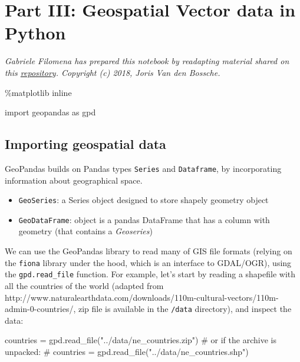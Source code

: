 \documentclass[
  letterpaper,
  DIV=11,
  numbers=noendperiod]{scrreprt}
\newenvironment{Shaded}{\begin{snugshade}}{\end{snugshade}}
\newcommand{\CommentTok}[1]{\textcolor[rgb]{0.37,0.37,0.37}{#1}}
\newcommand{\ImportTok}[1]{\textcolor[rgb]{0.00,0.46,0.62}{#1}}
\newcommand{\NormalTok}[1]{\textcolor[rgb]{0.00,0.23,0.31}{#1}}
\newcommand{\OperatorTok}[1]{\textcolor[rgb]{0.37,0.37,0.37}{#1}}
\newcommand{\StringTok}[1]{\textcolor[rgb]{0.13,0.47,0.30}{#1}}
\providecommand{\tightlist}{%
  \setlength{\itemsep}{0pt}\setlength{\parskip}{0pt}}\usepackage{longtable,booktabs,array}
\begin{document}
\section{Part III: Geospatial Vector data in
Python}\label{part-iii-geospatial-vector-data-in-python}

\emph{Gabriele Filomena has prepared this notebook by readapting
material shared on this
\href{https://github.com/jorisvandenbossche/geopandas-tutorial}{repository}.
Copyright (c) 2018, Joris Van den Bossche.}

\begin{Shaded}
\begin{Highlighting}[]
\OperatorTok{\%}\NormalTok{matplotlib inline}

\ImportTok{import}\NormalTok{ geopandas }\ImportTok{as}\NormalTok{ gpd}
\end{Highlighting}
\end{Shaded}

\subsection{Importing geospatial data}\label{importing-geospatial-data}

GeoPandas builds on Pandas types \texttt{Series} and \texttt{Dataframe},
by incorporating information about geographical space.

\begin{itemize}
\tightlist
\item
  \texttt{GeoSeries}: a Series object designed to store shapely geometry
  object
\item
  \texttt{GeoDataFrame}: object is a pandas DataFrame that has a column
  with geometry (that contains a \emph{Geoseries})
\end{itemize}

We can use the GeoPandas library to read many of GIS file formats
(relying on the \texttt{fiona} library under the hood, which is an
interface to GDAL/OGR), using the \texttt{gpd.read\_file} function. For
example, let's start by reading a shapefile with all the countries of
the world (adapted from
http://www.naturalearthdata.com/downloads/110m-cultural-vectors/110m-admin-0-countries/,
zip file is available in the \texttt{/data} directory), and inspect the
data:

\begin{Shaded}
\begin{Highlighting}[]
\NormalTok{countries }\OperatorTok{=}\NormalTok{ gpd.read\_file(}\StringTok{"../data/ne\_countries.zip"}\NormalTok{)}
\CommentTok{\# or if the archive is unpacked:}
\CommentTok{\# countries = gpd.read\_file("../data/ne\_countries.shp")}
\end{Highlighting}
\end{Shaded}
\end{document}
